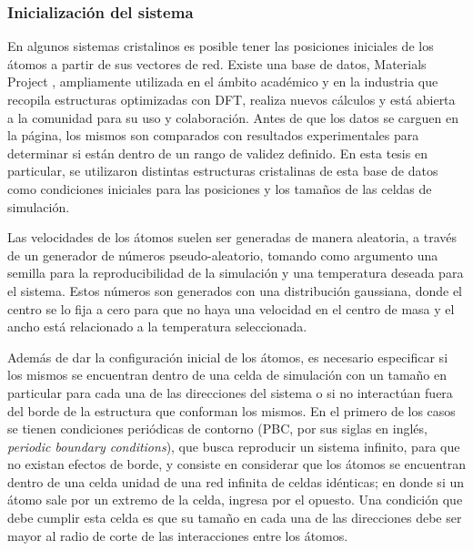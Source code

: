 \subsubsection{Inicialización del sistema}

En algunos sistemas cristalinos es posible tener las posiciones iniciales de los
átomos a partir de sus vectores de red. Existe una base de datos, Materials
Project \cite{materials_project}, ampliamente utilizada en el ámbito académico y 
en la industria que recopila estructuras optimizadas con DFT, realiza nuevos
cálculos y está abierta a la comunidad para su uso y colaboración. Antes de que 
los datos se carguen en la página, los mismos son comparados con resultados 
experimentales para determinar si están dentro de un rango de validez definido. 
En esta tesis en particular, se utilizaron distintas estructuras cristalinas de 
esta base de datos como condiciones iniciales para las posiciones y los tamaños 
de las celdas de simulación.

Las velocidades de los átomos suelen ser generadas de manera aleatoria, a través
de un generador de números pseudo-aleatorio, tomando como argumento una semilla 
para la reproducibilidad de la simulación y una temperatura deseada para el
sistema. Estos números son generados con una distribución gaussiana, donde el 
centro se lo fija a cero para que no haya una velocidad en el centro de masa y 
el ancho está relacionado a la temperatura seleccionada.

Además de dar la configuración inicial de los átomos, es necesario especificar si
los mismos se encuentran dentro de una celda de simulación con un tamaño en
particular para cada una de las direcciones del sistema o si no interactúan fuera
del borde de la estructura que conforman los mismos. En el primero de los casos
se tienen condiciones periódicas de contorno (PBC, por sus siglas en inglés, 
\textit{periodic boundary conditions}), que busca reproducir un sistema infinito,
para que no existan efectos de borde, y consiste en considerar que los átomos se 
encuentran dentro de una celda unidad de una red infinita de celdas idénticas; en
donde si un átomo sale por un extremo de la celda, ingresa por el opuesto. Una
condición que debe cumplir esta celda es que su tamaño en cada una de las 
direcciones debe ser mayor al radio de corte de las interacciones entre los 
átomos. %


